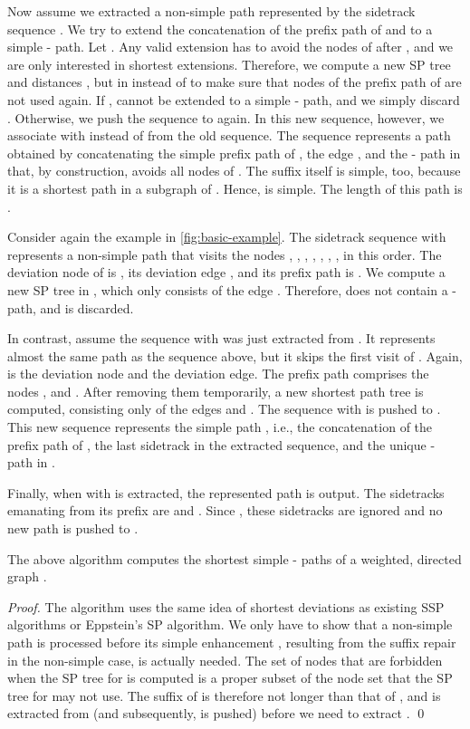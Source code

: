 \documentclass[runningheads,a4paper]{llncs}
\begin{document}
Now assume we extracted a non-simple path  represented by the sidetrack sequence .
We try to extend the concatenation of the prefix path of  and  to a simple - path.
Let .
Any valid extension has to avoid the nodes of  after , and we are only interested in shortest extensions.
Therefore, we compute a new SP tree  and distances , but in  instead of  to make sure that nodes of the prefix path of  are not used again.
If ,  cannot be extended to a simple - path, and we simply discard .
Otherwise, we push the sequence  to  again.
In this new sequence, however, we associate  with  instead of  from the old sequence.
The sequence represents a path  obtained by concatenating the simple prefix path of , the edge , and the - path in  that, by construction, avoids all nodes of .
The suffix itself is simple, too, because it is a shortest path in a subgraph of .
Hence,  is simple.
The length of this path is .

Consider again the example in \autoref{fig:basic-example}.
The sidetrack sequence  with  represents a non-simple path  that visits the nodes , , , , , , ,  in this order.
The deviation node of  is , its deviation edge , and its prefix path is .
We compute a new SP tree  in , which only consists of the edge .
Therefore,  does not contain a - path, and  is discarded.

In contrast, assume the sequence  with  was just extracted from .
It represents almost the same path as the sequence above, but it skips the first visit of .
Again,  is the deviation node and  the deviation edge.
The prefix path comprises the nodes ,  and .
After removing them temporarily, a new shortest path tree  is computed, consisting only of the edges  and .
The sequence  with  is pushed to .
This new sequence represents the simple path , i.e., the concatenation of the prefix path of , the last sidetrack  in the extracted sequence, and the unique - path in .

Finally, when  with  is extracted, the represented path is output.
The sidetracks emanating from its prefix are  and .
Since , these sidetracks are ignored and no new path is pushed to .

\begin{lemma}
	The above algorithm computes the  shortest simple - paths of a weighted, directed graph .
\end{lemma}
\begin{proof}
	The algorithm uses the same idea of shortest deviations as existing SSP algorithms or Eppstein's SP algorithm.
	We only have to show that a non-simple path  is processed before its simple enhancement , resulting from the suffix repair in the non-simple case, is actually needed.
	The set of nodes that are forbidden when the SP tree for  is computed is a proper subset of the node set that the SP tree for  may not use.
	The suffix of  is therefore not longer than that of , and  is extracted from  (and subsequently,  is pushed) before we need to extract .
	\qed
\end{proof}
\end{document}
